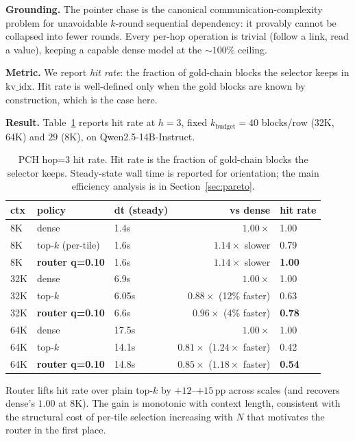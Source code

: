 \documentclass[11pt]{article}
\theoremstyle{remark}
\newcommand{\kbudget}{k_{\text{budget}}}
\begin{document}
\textbf{Grounding.} The pointer chase is the canonical communication-complexity problem for unavoidable $k$-round sequential dependency: it provably cannot be collapsed into fewer rounds. Every per-hop operation is trivial (follow a link, read a value), keeping a capable dense model at the $\sim 100\%$ ceiling.

\textbf{Metric.} We report \emph{hit rate}: the fraction of gold-chain blocks the selector keeps in $\text{kv\_idx}$. Hit rate is well-defined only when the gold blocks are known by construction, which is the case here.

\textbf{Result.} Table~\ref{tab:pch} reports hit rate at $h=3$, fixed $\kbudget=40$ blocks/row (32K, 64K) and $29$ (8K), on Qwen2.5-14B-Instruct.

\begin{table}[h]
\centering\small
\caption{PCH hop=3 hit rate. Hit rate is the fraction of gold-chain blocks the selector keeps. Steady-state wall time is reported for orientation; the main efficiency analysis is in Section~\ref{sec:pareto}.}\label{tab:pch}
\begin{tabular}{lllrl}
\toprule
ctx & policy & dt (steady) & vs dense & hit rate \\
\midrule
8K  & dense                & 1.4s & $1.00\times$ & 1.00 \\
8K  & top-$k$ (per-tile)   & 1.6s & $1.14\times$ slower & 0.79 \\
8K  & \textbf{router q=0.10} & 1.6s & $1.14\times$ slower & \textbf{1.00} \\
\midrule
32K & dense                & 6.9s & $1.00\times$ & 1.00 \\
32K & top-$k$              & 6.05s & $0.88\times$ (12\% faster) & 0.63 \\
32K & \textbf{router q=0.10} & 6.6s & $0.96\times$ (4\% faster) & \textbf{0.78} \\
\midrule
64K & dense                & 17.5s & $1.00\times$ & 1.00 \\
64K & top-$k$              & 14.1s & $0.81\times$ ($1.24\times$ faster) & 0.42 \\
64K & \textbf{router q=0.10} & 14.8s & $0.85\times$ ($1.18\times$ faster) & \textbf{0.54} \\
\bottomrule
\end{tabular}
\end{table}

Router lifts hit rate over plain top-$k$ by $+12$--$+15$\,pp across scales (and recovers dense's $1.00$ at 8K). The gain is monotonic with context length, consistent with the structural cost of per-tile selection increasing with $N$ that motivates the router in the first place.
\end{document}
